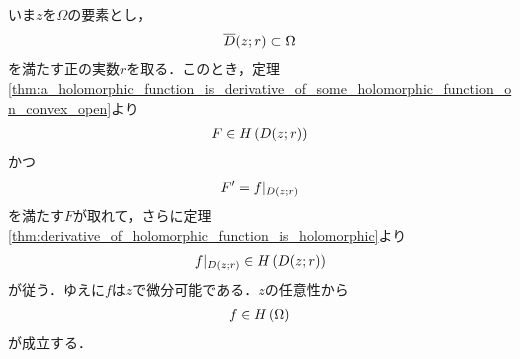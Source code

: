 	\begin{sketch}
		いま$z$を$\Omega$の要素とし，
		\begin{align}
			\overline{D}(z;r) \subset \Omega
		\end{align}
		を満たす正の実数$r$を取る．このとき，定理\ref{thm:a_holomorphic_function_is_derivative_of_some_holomorphic_function_on_convex_open}より
		\begin{align}
			F \in H\left(D(z;r)\right)
		\end{align}
		かつ
		\begin{align}
			F' = f|_{D(z;r)}
		\end{align}
		を満たす$F$が取れて，さらに定理\ref{thm:derivative_of_holomorphic_function_is_holomorphic}より
		\begin{align}
			f|_{D(z;r)} \in H\left(D(z;r)\right)
		\end{align}
		が従う．ゆえに$f$は$z$で微分可能である．$z$の任意性から
		\begin{align}
			f \in H\left(\Omega\right)
		\end{align}
		が成立する．
		\QED
	\end{sketch}
	